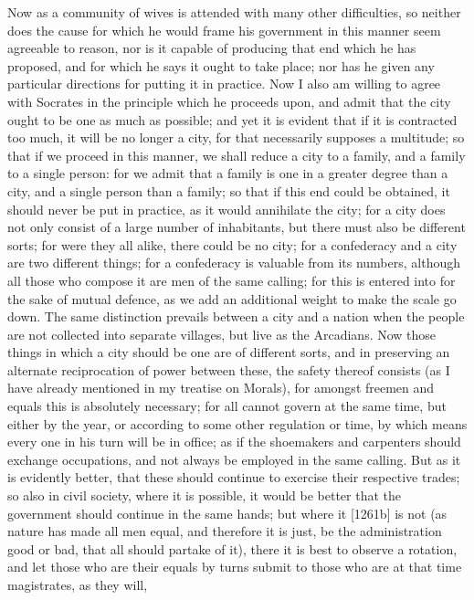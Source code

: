 Now as a community of wives is attended with many other difficulties, so
neither does the cause for which he would frame his government in this
manner seem agreeable to reason, nor is it capable of producing that end
which he has proposed, and for which he says it ought to take place; nor
has he given any particular directions for putting it in practice. Now I
also am willing to agree with Socrates in the principle which he proceeds
upon, and admit that the city ought to be one as much as possible; and yet
it is evident that if it is contracted too much, it will be no longer a
city, for that necessarily supposes a multitude; so that if we proceed in
this manner, we shall reduce a city to a family, and a family to a single
person: for we admit that a family is one in a greater degree than a city,
and a single person than a family; so that if this end could be obtained,
it should never be put in practice, as it would annihilate the city; for a
city does not only consist of a large number of inhabitants, but there
must also be different sorts; for were they all alike, there could be no
city; for a confederacy and a city are two different things; for a
confederacy is valuable from its numbers, although all those who compose
it are men of the same calling; for this is entered into for the sake of
mutual defence, as we add an additional weight to make the scale go down.
The same distinction prevails between a city and a nation when the people
are not collected into separate villages, but live as the Arcadians. Now
those things in which a city should be one are of different sorts, and in
preserving an alternate reciprocation of power between these, the safety
thereof consists (as I have already mentioned in my treatise on Morals),
for amongst freemen and equals this is absolutely necessary; for all
cannot govern at the same time, but either by the year, or according to
some other regulation or time, by which means every one in his turn will
be in office; as if the shoemakers and carpenters should exchange
occupations, and not always be employed in the same calling. But as it is
evidently better, that these should continue to exercise their respective
trades; so also in civil society, where it is possible, it would be better
that the government should continue in the same hands; but where it
[1261b] is not (as nature has made all men equal, and therefore it is
just, be the administration good or bad, that all should partake of it),
there it is best to observe a rotation, and let those who are their equals
by turns submit to those who are at that time magistrates, as they will,

